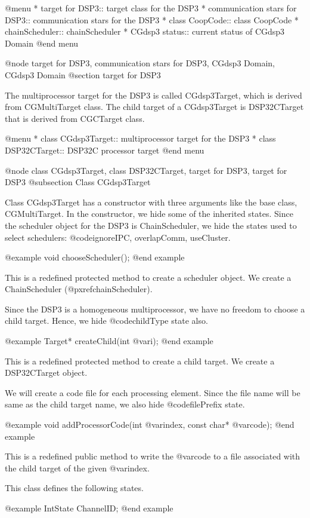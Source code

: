 {@menu
* target for DSP3::			target class for the DSP3
* communication stars for DSP3::	communication stars for the DSP3
* class CoopCode::			class CoopCode
* chainScheduler::			chainScheduler
* CGdsp3 status::			current status of CGdsp3 Domain
@end menu

@node target for DSP3, communication stars for DSP3, CGdsp3 Domain, CGdsp3 Domain
@section target for DSP3

The multiprocessor target for the DSP3 is called CGdsp3Target, which is
derived from CGMultiTarget class. The child target of a CGdsp3Target is
DSP32CTarget that is derived from CGCTarget class. 

@menu
* class CGdsp3Target::		multiprocessor target for the DSP3
* class DSP32CTarget::		DSP32C processor target
@end menu

@node class CGdsp3Target, class DSP32CTarget, target for DSP3, target for DSP3
@subsection Class CGdsp3Target

Class CGdsp3Target has a constructor with three arguments like the base class,
CGMultiTarget. In the constructor, we hide some of the inherited states.
Since the scheduler object for the DSP3 is ChainScheduler, we hide the states
used to select schedulers: @code{ignoreIPC, overlapComm, useCluster}.

@example
void chooseScheduler();
@end example

This is a redefined protected method to create a scheduler object. We create
a ChainScheduler (@pxref{chainScheduler}).

Since the DSP3 is a homogeneous multiprocessor, we have no freedom to choose
a child target. Hence, we hide @code{childType} state also.

@example
Target* createChild(int @var{i});
@end example

This is a redefined protected method to create a child target. We create a
DSP32CTarget object.

We will create a code file for each processing element. Since the file name
will be same as the child target name, we also hide @code{filePrefix} state.

@example
void addProcessorCode(int @var{index}, const char* @var{code});
@end example

This is a redefined public method to write the @var{code} to a 
file associated with the child target of the given @var{index}.

This class defines the following states.

@example
IntState ChannelID;
@end example

}
